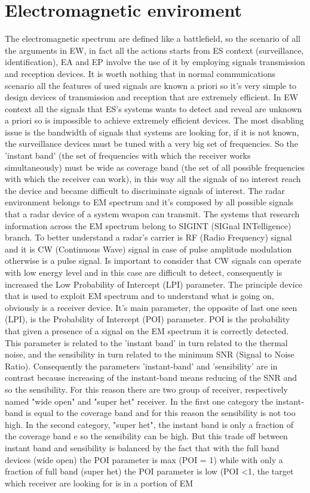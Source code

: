 \documentclass[12pt]{report}
\begin{document}
\section{Electromagnetic enviroment}
The electromagnetic spectrum are defined like a battlefield, so the scenario of all the arguments in EW, in fact all the actions starts from ES context (surveillance, identification), EA and EP involve the use of it by employing signals transmission and reception devices. It is worth nothing that in normal communications scenario all the features of used signals are known a priori so it's very simple to design devices of transmission and reception that are extremely efficient. In EW context all the signals that ES's systems wants to detect and reveal are unknown a priori so is impossible to achieve extremely efficient devices. The most disabling issue is the bandwidth of signals that systems are looking for, if it is not known, the surveillance devices must be tuned with a very big set of frequencies. So the 'instant band' (the set of frequencies with which the receiver works simultaneously) must be wide as coverage band (the set of all possible frequencies with which the receiver can work), in this way all the signals of no interest reach the device and became difficult to discriminate signals of interest. The radar environment belongs to EM spectrum and it's composed by all possible signals that a radar device of a system weapon can transmit. The systems that research information across the EM spectrum belong to SIGINT (SIGnal INTelligence) branch. To better understand a radar's carrier is RF (Radio Frequency) signal and it is CW (Continuous Wave) signal in case of pulse amplitude modulation otherwise is a pulse signal. Is important to consider that CW signals can operate with low energy level and in this case are difficult to detect, consequently is increased the Low Probability of Intercept (LPI) parameter. The principle device that is used to exploit EM spectrum and to understand what is going on, obviously is a receiver device. It's main parameter, the opposite of last one seen (LPI), is the Probability of Intercept (POI) parameter. POI is the probability that given a presence of a signal on the EM spectrum it is correctly detected. This parameter is related to the 'instant band' in turn related to the thermal noise, and the sensibility in turn related to the minimum SNR (Signal to Noise Ratio). Consequently the parameters 'instant-band' and 'sensibility' are in contrast because increasing of the instant-band means reducing of the SNR and so the sensibility. For this reason there are two group of receiver, respectively named "wide open" and "super het" receiver. In the first one category the instant-band is equal to the coverage band and for this reason the sensibility is not too high. In the second category, "super het", the instant band is only a fraction of the coverage band e so the sensibility can be high. But this trade off between instant band and sensibility is balanced by the fact that with the full band devices (wide open) the POI parameter is max (POI = 1) while with only a fraction of full band (super het) the POI parameter is low (POI \textless 1, the target which receiver are looking for is in a portion of EM 
\end{document}
